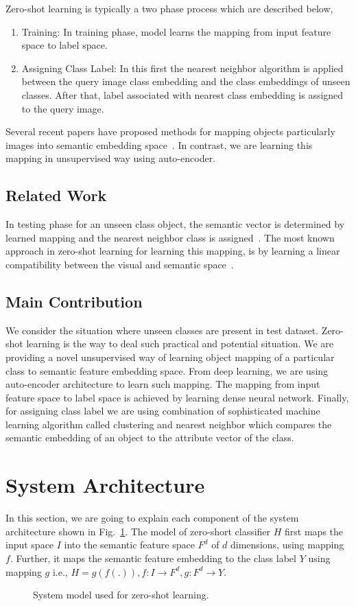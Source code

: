\documentclass[11pt, conference, english]{IEEEtran}
\theoremstyle{plain}
\theoremstyle{definition}
\theoremstyle{remark}
\begin{document}
	Zero-shot learning is typically a two phase process which are described below,
	\begin{enumerate}
		\item Training: In training phase, model learns the mapping from input feature space to label space.
		\item Assigning Class Label: In this first the nearest neighbor algorithm is applied between the query image class embedding and the class embeddings of unseen classes. After that, label associated with nearest class embedding is assigned to the query image.
	\end{enumerate}
	Several recent papers have proposed methods for mapping objects particularly images into semantic embedding space~\cite{frome2013devise,lake2011one}. In contrast, we are learning this mapping in unsupervised way using auto-encoder.
	\subsection{Related Work}
	In testing phase for an unseen class
	object,  the semantic vector is determined by learned mapping and the nearest
	neighbor class is assigned~\cite{wang2016relational,socher2013zero}. The most known
	approach in zero-shot learning for learning this mapping, is by learning a linear compatibility between the visual and semantic space~\cite{frome2013devise}.
	\subsection{Main Contribution}
	We consider the situation where unseen classes are present in test dataset. Zero-shot learning is the way to deal such practical and potential situation. We are providing a novel unsupervised way of learning object mapping of a particular class to semantic feature embedding space. From deep learning, we are using auto-encoder architecture to learn such mapping. The mapping from input feature space to label space is achieved by learning dense neural network. Finally, for assigning class label we are using combination of sophisticated machine learning algorithm called clustering and nearest neighbor which compares the semantic embedding of an object to the attribute vector of the class. 
	\section{System Architecture}
	In this section, we are going to explain each component of the system architecture shown in Fig.~\ref{Fig:SystemModel}. The model of zero-short classifier $H$ first maps the input space $I$ into the semantic feature space $F^d$ of $d$ dimensions, using mapping $f$. Further, it  maps  the semantic feature embedding to the class label $Y$ using mapping $g$ i.e.,
	$H=g(f(.)),
		f: I \rightarrow F^d,
		g: F^d \rightarrow Y.$
	\begin{figure}[h!]
		\centering
		\scalebox{.5}{}
		\caption{System model used for zero-shot learning.}
		\label{Fig:SystemModel}
	\end{figure}
\end{document}
